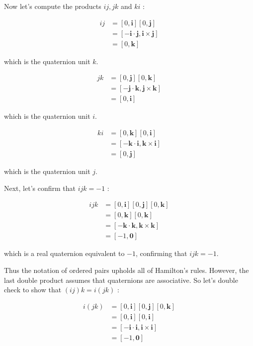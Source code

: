 Now let's compute the products $i j, j k$ and $k i$ :

$$
\begin{aligned}
i j & =[0, \mathbf{i}][0, \mathbf{j}] \\
& =[-\mathbf{i} \cdot \mathbf{j}, \mathbf{i} \times \mathbf{j}] \\
& =[0, \mathbf{k}]
\end{aligned}
$$

which is the quaternion unit $k$.

$$
\begin{aligned}
j k & =[0, \mathbf{j}][0, \mathbf{k}] \\
& =[-\mathbf{j} \cdot \mathbf{k}, \mathbf{j} \times \mathbf{k}] \\
& =[0, \mathbf{i}]
\end{aligned}
$$

which is the quaternion unit $i$.

$$
\begin{aligned}
k i & =[0, \mathbf{k}][0, \mathbf{i}] \\
& =[-\mathbf{k} \cdot \mathbf{i}, \mathbf{k} \times \mathbf{i}] \\
& =[0, \mathbf{j}]
\end{aligned}
$$

which is the quaternion unit $j$.

Next, let's confirm that $i j k=-1$ :

$$
\begin{aligned}
i j k & =[0, \mathbf{i}][0, \mathbf{j}][0, \mathbf{k}] \\
& =[0, \mathbf{k}][0, \mathbf{k}] \\
& =[-\mathbf{k} \cdot \mathbf{k}, \mathbf{k} \times \mathbf{k}] \\
& =[-1, \mathbf{0}]
\end{aligned}
$$

which is a real quaternion equivalent to $-1$, confirming that $i j k=-1$.

Thus the notation of ordered pairs upholds all of Hamilton's rules. However, the last double product assumes that quaternions are associative. So let's double check to show that $(i j) k=i(j k)$ :

$$
\begin{aligned}
i(j k) & =[0, \mathbf{i}][0, \mathbf{j}][0, \mathbf{k}] \\
& =[0, \mathbf{i}][0, \mathbf{i}] \\
& =[-\mathbf{i} \cdot \mathbf{i}, \mathbf{i} \times \mathbf{i}] \\
& =[-1, \mathbf{0}]
\end{aligned}
$$

